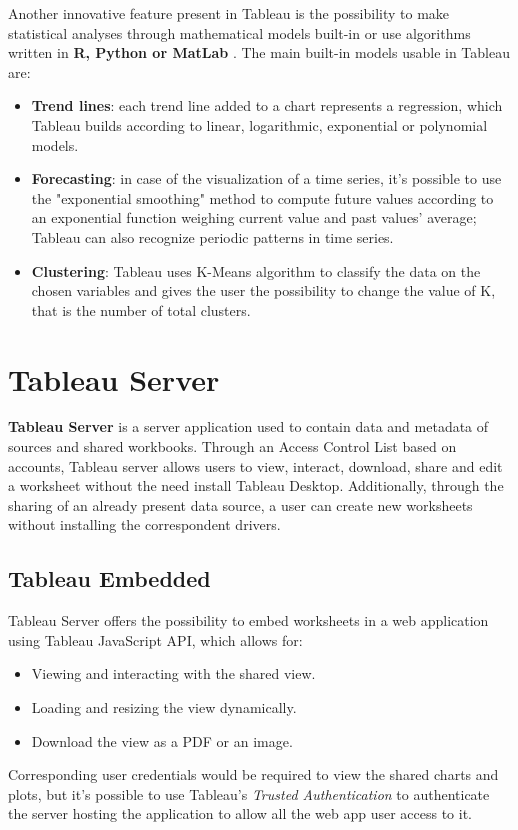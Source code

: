 Another innovative feature present in Tableau is the possibility to make statistical analyses through mathematical models built-in or use algorithms written in \textbf{R, Python or MatLab} \cite{LearningTableau}. The main built-in models usable in Tableau are:

\begin{itemize}
    \item \textbf{Trend lines}: each trend line added to a chart represents a regression, which Tableau builds according to linear, logarithmic, exponential or polynomial models.
    \item \textbf{Forecasting}: in case of the visualization of a time series, it's possible to use the "exponential smoothing" method to compute future values according to an exponential function weighing current value and past values' average; Tableau can also recognize periodic patterns in time series.
    \item \textbf{Clustering}: Tableau uses K-Means algorithm to classify the data on the chosen variables and gives the user the possibility to change the value of K, that is the number of total clusters.
\end{itemize}

\section{Tableau Server}

\textbf{Tableau Server} is a server application used to contain data and metadata of sources and shared workbooks. Through an Access Control List based on accounts, Tableau server allows users to view, interact, download, share and edit a worksheet without the need install Tableau Desktop. Additionally, through the sharing of an already present data source, a user can create new worksheets without installing the correspondent drivers.

\subsection{Tableau Embedded}

Tableau Server offers the possibility to embed worksheets in a web application using Tableau JavaScript API, which allows for:

\begin{itemize}
    \item Viewing and interacting with the shared view.
    \item Loading and resizing the view dynamically.
    \item Download the view as a PDF or an image.
\end{itemize}

Corresponding user credentials would be required to view the shared charts and plots, but it's possible to use Tableau's \textit{Trusted Authentication} to authenticate the server hosting the application to allow all the web app user access to it.